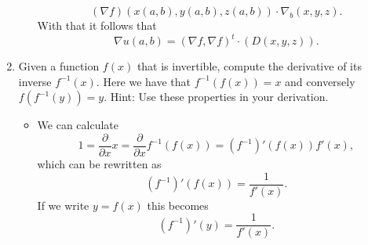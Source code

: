 \documentclass{article}
\begin{document}
\begin{enumerate}
\begin{itemize}
	$$
	(\nabla f)(x(a, b), y(a, b), z(a, b)) \cdot \nabla_b (x, y, z).
	$$
	With that it follows that
	$$
	\nabla u(a, b) = (\nabla f, \nabla f)^t \cdot (D(x, y, z)).
	$$
	\end{itemize}
\item Given a function $f(x)$ that is invertible, compute the derivative of its inverse $f^{-1}(x)$. Here we have that $f^{-1}(f(x)) = x$ and conversely $f(f^{-1}(y)) = y$. Hint: Use these properties in your derivation.
	\begin{itemize}
		\item We can calculate
		$$
		1 = \frac{\partial}{\partial x} x = \frac{\partial}{\partial x} f^{-1}(f(x)) = (f^{-1})'(f(x)) f'(x),
		$$
		which can be rewritten as
		$$
		(f^{-1})'(f(x)) = \frac{1}{f'(x)}.
		$$
		If we write $y = f(x)$ this becomes
		$$
		(f^{-1})'(y) = \frac{1}{f'(x)}.
		$$
	\end{itemize}
\end{enumerate}
\end{document}
